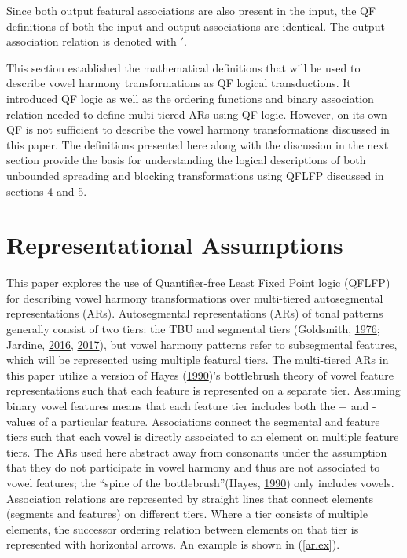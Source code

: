 \documentclass[,doc,floatsintext]{apa6}
\theoremstyle{definition}
\theoremstyle{definition}
\theoremstyle{definition}
\theoremstyle{remark}
\begin{document}
\noindent Since both output featural associations are also present in
the input, the QF definitions of both the input and output associations
are identical. The output association relation is denoted with \('\).

This section established the mathematical definitions that will be used
to describe vowel harmony transformations as QF logical transductions.
It introduced QF logic as well as the ordering functions and binary
association relation needed to define multi-tiered ARs using QF logic.
However, on its own QF is not sufficient to describe the vowel harmony
transformations discussed in this paper. The definitions presented here
along with the discussion in the next section provide the basis for
understanding the logical descriptions of both unbounded spreading and
blocking transformations using QFLFP discussed in sections 4 and 5.

\section{Representational
Assumptions}\label{representational-assumptions}

This paper explores the use of Quantifier-free Least Fixed Point logic
(QFLFP) for describing vowel harmony transformations over multi-tiered
autosegmental representations (ARs). Autosegmental representations (ARs)
of tonal patterns generally consist of two tiers: the TBU and segmental
tiers (Goldsmith, \protect\hyperlink{ref-Goldsmith1976}{1976}; Jardine,
\protect\hyperlink{ref-jardinediss}{2016},
\protect\hyperlink{ref-jardinelocaltone}{2017}), but vowel harmony
patterns refer to subsegmental features, which will be represented using
multiple featural tiers. The multi-tiered ARs in this paper utilize a
version of Hayes (\protect\hyperlink{ref-hayes1990}{1990})'s bottlebrush
theory of vowel feature representations such that each feature is
represented on a separate tier. Assuming binary vowel features means
that each feature tier includes both the + and - values of a particular
feature. Associations connect the segmental and feature tiers such that
each vowel is directly associated to an element on multiple feature
tiers. The ARs used here abstract away from consonants under the
assumption that they do not participate in vowel harmony and thus are
not associated to vowel features; the \enquote{spine of the
bottlebrush}(Hayes, \protect\hyperlink{ref-hayes1990}{1990}) only
includes vowels. Association relations are represented by straight lines
that connect elements (segments and features) on different tiers. Where
a tier consists of multiple elements, the successor ordering relation
between elements on that tier is represented with horizontal arrows. An
example is shown in (\ref{ar.ex}).
\end{document}

